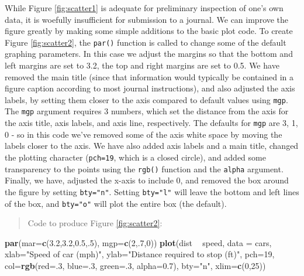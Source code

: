 \documentclass[letterpaper,]{book}
\newenvironment{Shaded}{\begin{snugshade}}{\end{snugshade}}
\newcommand{\DataTypeTok}[1]{\textcolor[rgb]{0.13,0.29,0.53}{#1}}
\newcommand{\DecValTok}[1]{\textcolor[rgb]{0.00,0.00,0.81}{#1}}
\newcommand{\FloatTok}[1]{\textcolor[rgb]{0.00,0.00,0.81}{#1}}
\newcommand{\KeywordTok}[1]{\textcolor[rgb]{0.13,0.29,0.53}{\textbf{#1}}}
\newcommand{\NormalTok}[1]{#1}
\newcommand{\OperatorTok}[1]{\textcolor[rgb]{0.81,0.36,0.00}{\textbf{#1}}}
\newcommand{\StringTok}[1]{\textcolor[rgb]{0.31,0.60,0.02}{#1}}
\begin{document}
While Figure \ref{fig:scatter1} is adequate for preliminary inspection of one's own data, it is woefully insufficient for submission to a journal. We can improve the figure greatly by making some simple additions to the basic plot code. To create Figure \ref{fig:scatter2}, the \texttt{par()} function is called to change some of the default graphing parameters. In this case we adjust the margins so that the bottom and left margins are set to 3.2, the top and right margins are set to 0.5. We have removed the main title (since that information would typically be contained in a figure caption according to most journal instructions), and also adjusted the axis labels, by setting them closer to the axis compared to default values using \texttt{mgp}. The \texttt{mgp} argument requires 3 numbers, which set the distance from the axis for the axis title, axis labels, and axis line, respectively. The defaults for \texttt{mgp} are 3, 1, 0 - so in this code we've removed some of the axis white space by moving the labels closer to the axis. We have also added axis labels and a main title, changed the plotting character (\texttt{pch=19}, which is a closed circle), and added some transparency to the points using the \texttt{rgb()} function and the \texttt{alpha} argument. Finally, we have, adjusted the x-axis to include 0, and removed the box around the figure by setting \texttt{bty="n"}. Setting \texttt{bty="l"} will leave the bottom and left lines of the box, and \texttt{bty="o"} will plot the entire box (the default).

\begin{quote}
Code to produce Figure \ref{fig:scatter2}:
\end{quote}

\begin{Shaded}
\begin{Highlighting}[]
\KeywordTok{par}\NormalTok{(}\DataTypeTok{mar=}\KeywordTok{c}\NormalTok{(}\FloatTok{3.2}\NormalTok{,}\FloatTok{3.2}\NormalTok{,}\FloatTok{0.5}\NormalTok{,.}\DecValTok{5}\NormalTok{), }\DataTypeTok{mgp=}\KeywordTok{c}\NormalTok{(}\DecValTok{2}\NormalTok{,.}\DecValTok{7}\NormalTok{,}\DecValTok{0}\NormalTok{))}
\KeywordTok{plot}\NormalTok{(dist }\OperatorTok{~}\StringTok{ }\NormalTok{speed, }\DataTypeTok{data =}\NormalTok{ cars,}
     \DataTypeTok{xlab=}\StringTok{"Speed of car (mph)"}\NormalTok{, }
     \DataTypeTok{ylab=}\StringTok{"Distance required to stop (ft)"}\NormalTok{,}
     \DataTypeTok{pch=}\DecValTok{19}\NormalTok{, }\DataTypeTok{col=}\KeywordTok{rgb}\NormalTok{(}\DataTypeTok{red=}\NormalTok{.}\DecValTok{3}\NormalTok{, }\DataTypeTok{blue=}\NormalTok{.}\DecValTok{3}\NormalTok{, }\DataTypeTok{green=}\NormalTok{.}\DecValTok{3}\NormalTok{, }\DataTypeTok{alpha=}\FloatTok{0.7}\NormalTok{),}
     \DataTypeTok{bty=}\StringTok{"n"}\NormalTok{, }\DataTypeTok{xlim=}\KeywordTok{c}\NormalTok{(}\DecValTok{0}\NormalTok{,}\DecValTok{25}\NormalTok{))}
\end{Highlighting}
\end{Shaded}
\end{document}
